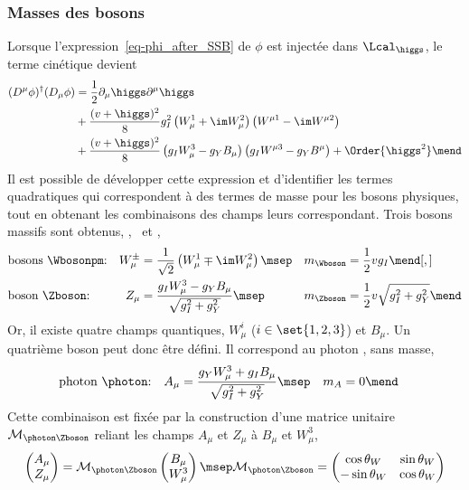 \subsubsection{Masses des bosons}\label{chapter-MS-MSSM-section-formalisme-subsec-Higgs_mechanism-subsubsec-bosons}
Lorsque l'expression~\eqref{eq-phi_after_SSB} de $\phi$ est injectée dans $\Lcal_{\higgs}$, le terme cinétique devient
\begin{align}
(D^\mu\phi)^\dagger(D_\mu\phi)
&
=
\frac{1}{2}\partial_\mu \higgs \partial^\mu \higgs
\nonumber\\&
+
\frac{(v+\higgs)^2}{8} g_I^2 \left(W_\mu^1 + \im W_\mu^2\right) \left( W^{\mu1}-\im W^{\mu2}\right)
\nonumber\\&
+
\frac{(v+\higgs)^2}{8} \left(g_I W_\mu^3 - g_Y B_\mu \right) \left( g_I W^{\mu3}-g_Y B^\mu \vphantom{W^{\mu1}}\right)
+ \Order{\higgs^2}
\mend
\end{align}
Il est possible de développer cette expression et d'identifier les termes quadratiques qui correspondent à des termes de masse pour les bosons physiques, tout en obtenant les combinaisons des champs leurs correspondant.
Trois bosons massifs sont obtenus, \Wbosonplus, \Wbosonminus\ et \Zboson,
\begin{align}
&
\text{bosons \Wbosonpm:}
&
W_\mu^\pm &= \frac{1}{\sqrt{2}} \left( W_\mu^1 \mp \im W_\mu^2 \right)
\msep&
m_{\Wboson} &= \frac{1}{2} v g_I
\mend[,]
\\
&
\text{boson \Zboson:}
&
Z_\mu &= \frac{g_I W_\mu^3 - g_Y B_\mu}{\sqrt{g_I^2 + g_Y^2}}
\msep&
m_{\Zboson} &= \frac{1}{2} v \sqrt{g_I^2 + g_Y^2}
\label{eq-Z_boson_from_higgs}
\mend
\end{align}
Or, il existe quatre champs quantiques, $W_\mu^i$ ($i\in\set{1,2,3}$) et $B_\mu$.
Un quatrième boson peut donc être défini.
Il correspond au photon \photon, sans masse,
\begin{align}
&
\text{photon \photon:}
&
A_\mu &= \frac{g_Y W_\mu^3 + g_I B_\mu}{\sqrt{g_I^2 + g_Y^2}}
\msep&
m_A &= 0
\mend
\end{align}
Cette combinaison est fixée par la construction d'une matrice unitaire $\mathcal{M}_{\photon\Zboson}$ reliant les champs
$A_\mu$ et $Z_\mu$
à
$B_\mu$ et $W_\mu^3$,
\begin{equation}
\begin{pmatrix}
A_\mu \\ Z_\mu
\end{pmatrix}
=
\mathcal{M}_{\photon\Zboson}
\begin{pmatrix}
B_\mu \\ W_\mu^3
\end{pmatrix}
\msep
\mathcal{M}_{\photon\Zboson} = \begin{pmatrix}
\cos \theta_W & \sin \theta_W\\
- \sin \theta_W & \cos \theta_W
\end{pmatrix}
\end{equation}
